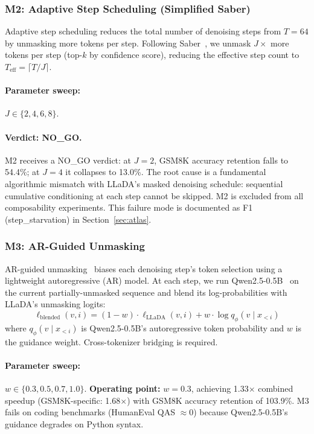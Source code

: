 \documentclass{article}
\begin{document}
\subsubsection{M2: Adaptive Step Scheduling (Simplified Saber)}

Adaptive step scheduling reduces the total number of denoising steps from $T = 64$ by unmasking more
tokens per step. Following Saber~\cite{saber}, we unmask $J \times$ more tokens per step (top-$k$
by confidence score), reducing the effective step count to $T_{\text{eff}} = \lceil T / J \rceil$.

\paragraph{Parameter sweep:} $J \in \{2, 4, 6, 8\}$.

\paragraph{Verdict: NO\_GO.} M2 receives a NO\_GO verdict: at $J = 2$, GSM8K accuracy retention
falls to 54.4\%; at $J = 4$ it collapses to 13.0\%. The root cause is a fundamental algorithmic
mismatch with LLaDA's masked denoising schedule: sequential cumulative conditioning at each step
cannot be skipped. M2 is excluded from all composability experiments. This failure mode is
documented as F1 (step\_starvation) in Section~\ref{sec:atlas}.

\subsubsection{M3: AR-Guided Unmasking}

AR-guided unmasking~\cite{flashdlm} biases each denoising step's token selection using a lightweight
autoregressive (AR) model. At each step, we run Qwen2.5-0.5B~\cite{qwen25} on the current
partially-unmasked sequence and blend its log-probabilities with LLaDA's unmasking logits:
\begin{equation}
  \ell_{\text{blended}}(v, i) = (1 - w) \cdot \ell_{\text{LLaDA}}(v, i)
    + w \cdot \log q_\phi(v \mid x_{<i})
\end{equation}
where $q_\phi(v \mid x_{<i})$ is Qwen2.5-0.5B's autoregressive token probability and $w$ is the
guidance weight. Cross-tokenizer bridging is required.

\paragraph{Parameter sweep:} $w \in \{0.3, 0.5, 0.7, 1.0\}$. \textbf{Operating point:} $w = 0.3$,
achieving 1.33$\times$ combined speedup (GSM8K-specific: 1.68$\times$) with GSM8K accuracy
retention of 103.9\%. M3 fails on coding benchmarks (HumanEval QAS $\approx 0$) because
Qwen2.5-0.5B's guidance degrades on Python syntax.
\end{document}
